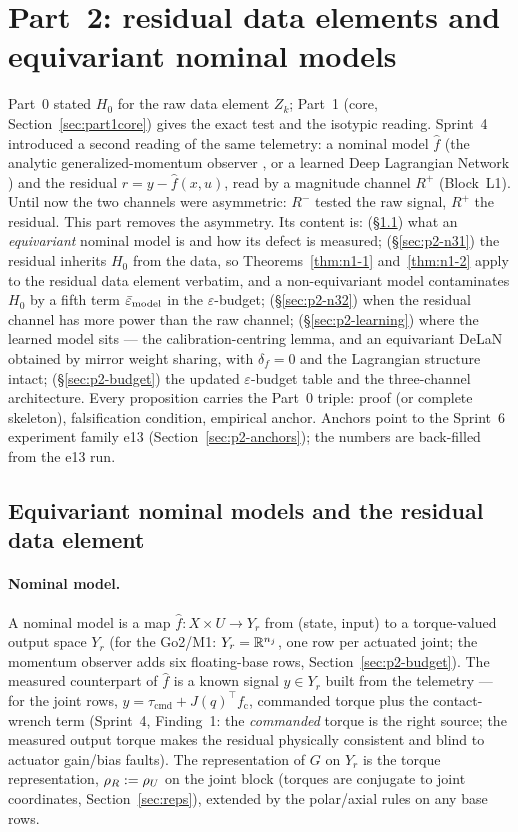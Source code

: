 \section{Part~2: residual data elements and equivariant nominal models}
\label{sec:part2}

Part~0 stated $H_0$ for the raw data element $Z_k$; Part~1 (core,
Section~\ref{sec:part1core}) gives the exact test and the isotypic reading.
Sprint~4 introduced a second reading of the same telemetry: a nominal model
$\hat f$ (the analytic generalized-momentum observer
\cite{deluca2003actuator,haddadin2017robot,evangelisti2024datadriven}, or a
learned Deep Lagrangian Network \cite{lutter2019delan}) and the residual
$r = y - \hat f(x,u)$, read by a magnitude channel $R^{+}$ (Block~L1). Until
now the two channels were asymmetric: $R^{-}$ tested the raw signal, $R^{+}$
the residual. This part removes the asymmetry. Its content is: (\S\ref{sec:p2-defs})
what an \emph{equivariant} nominal model is and how its defect is measured;
(\S\ref{sec:p2-n31}) the residual inherits $H_0$ from the data, so
Theorems~\ref{thm:n1-1} and~\ref{thm:n1-2} apply to the residual data element
verbatim, and a non-equivariant model contaminates $H_0$ by a fifth term
$\bar\varepsilon_{\mathrm{model}}$ in the $\varepsilon$-budget; (\S\ref{sec:p2-n32}) when the
residual channel has more power than the raw channel; (\S\ref{sec:p2-learning})
where the learned model sits --- the calibration-centring lemma, and an
equivariant DeLaN obtained by mirror weight sharing, with $\delta_f = 0$ and
the Lagrangian structure intact; (\S\ref{sec:p2-budget}) the updated
$\varepsilon$-budget table and the three-channel architecture. Every
proposition carries the Part~0 triple: proof (or complete skeleton),
falsification condition, empirical anchor. Anchors point to the Sprint~6
experiment family e13 (Section~\ref{sec:p2-anchors}); the numbers are
back-filled from the e13 run.

\subsection{Equivariant nominal models and the residual data element}
\label{sec:p2-defs}

\paragraph{Nominal model.}
A nominal model is a map $\hat f : X \times U \to Y_r$ from (state, input)
to a torque-valued output space $Y_r$ (for the Go2/M1: $Y_r = \mathbb{R}^{n_j}$, one
row per actuated joint; the momentum observer adds six floating-base rows,
Section~\ref{sec:p2-budget}). The measured counterpart of $\hat f$ is a
known signal $y \in Y_r$ built from the telemetry --- for the joint rows,
$y = \tau_{\mathrm{cmd}} + J(q)^{\top} f_{\mathrm{c}}$, commanded torque
plus the contact-wrench term (Sprint~4, Finding~1: the \emph{commanded}
torque is the right source; the measured output torque makes the residual
physically consistent and blind to actuator gain/bias faults). The
representation of $G$ on $Y_r$ is the torque representation,
$\rho_{R} := \rho_{U}$ on the joint block (torques are conjugate to joint
coordinates, Section~\ref{sec:reps}), extended by the polar/axial rules on
any base rows.

